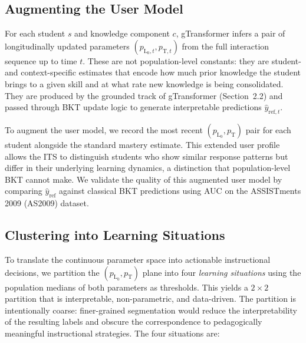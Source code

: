 \documentclass[runningheads]{llncs}
\begin{document}
\subsection{Augmenting the User Model}

For each student $s$ and knowledge component $c$, gTransformer infers a pair of longitudinally updated parameters $(p_{\text{L}_0,t}, p_{\text{T},t})$ from the full interaction sequence up to time $t$. These are not population-level constants: they are student- and context-specific estimates that encode how much prior knowledge the student brings to a given skill and at what rate new knowledge is being consolidated. They are produced by the grounded track of gTransformer (Section~2.2) and passed through BKT update logic to generate interpretable predictions $\hat{y}_{\text{ref},t}$.

To augment the user model, we record the most recent $(p_{\text{L}_0}, p_{\text{T}})$ pair for each student alongside the standard mastery estimate. This extended user profile allows the ITS to distinguish students who show similar response patterns but differ in their underlying learning dynamics, a distinction that population-level BKT cannot make. We validate the quality of this augmented user model by comparing $\hat{y}_{\text{ref}}$ against classical BKT predictions using AUC on the ASSISTments 2009 (AS2009) dataset.

\subsection{Clustering into Learning Situations}

To translate the continuous parameter space into actionable instructional decisions, we partition the $(p_{\text{L}_0}, p_{\text{T}})$ plane into four \textit{learning situations} using the population medians of both parameters as thresholds. This yields a $2 \times 2$ partition that is interpretable, non-parametric, and data-driven. The partition is intentionally coarse: finer-grained segmentation would reduce the interpretability of the resulting labels and obscure the correspondence to pedagogically meaningful instructional strategies. The four situations are:
\end{document}
